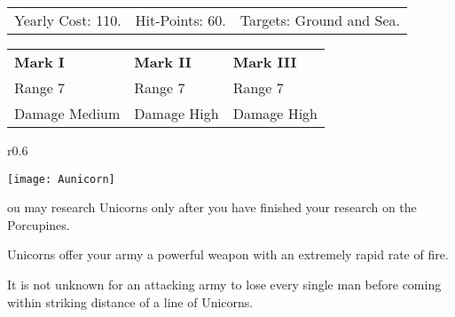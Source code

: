 
\begin{tabular}{p{1.264in} p{1.264in} p{1.264in}}
	Yearly Cost: 110. & Hit-Points: 60. & Targets: Ground and Sea.
\end{tabular}

\begin{tabular}{|p{1.264in} p{1.264in} p{1.264in}|}
	\hline
	\textbf{Mark I}	& \textbf{Mark II} & \textbf{Mark III} \\ 
	Range 7	& Range 7 & Range 7 \\ 
	Damage Medium & Damage High & Damage High \\ 
	\hline
\end{tabular}

\begin{wrapfigure}{r}{0.6\textwidth}
	\vspace{-20pt}
	\begin{center}
		\texttt{[image: Aunicorn]} %
	\end{center}
	\vspace{-20pt}
\end{wrapfigure}

ou may research Unicorns only after you have finished your research on the Porcupines.

Unicorns offer your army a powerful weapon with an extremely rapid rate of fire.


It is not unknown for an attacking army to lose every single man before coming within striking distance of a line of Unicorns.